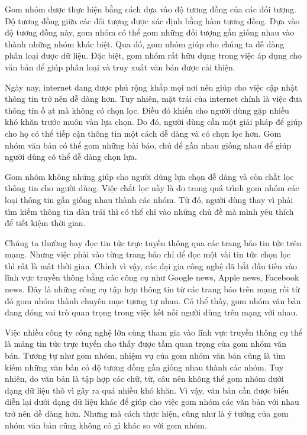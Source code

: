Gom nhóm được thực hiện bằng cách dựa vào độ tương đồng của các đối tượng.
Độ tương đồng giữa các đối tượng được xác định bằng hàm tương đồng.
Dựa vào độ tương đồng này, gom nhóm có thể gom những đối tượng gần giống nhau vào thành những nhóm khác biệt.
Qua đó, gom nhóm giúp cho chúng ta dễ dàng phân loại được dữ liệu.
Đặc biệt, gom nhóm rất hữu dụng trong việc áp dụng cho văn bản để giúp phân loại và truy xuất văn bản được cải thiện.

Ngày nay, internet đang được phủ rộng khắp mọi nơi nên giúp cho việc cập nhật thông tin trở nên dễ dàng hơn.
Tuy nhiên, mặt trái của internet chính là việc đưa thông tin ồ ạt mà không có chọn lọc.
Điều đó khiến cho người dùng gặp nhiều khó khăn trước muôn vàn lựa chọn.
Do đó, người dùng cần một giải pháp để giúp cho họ có thể tiếp cận thông tin một cách dễ dàng và có chọn lọc hơn.
Gom nhóm văn bản có thể gom những bài báo, chủ để gần nhau giống nhau để giúp người dùng có thể dễ dàng chọn lựa.

Gom nhóm không những giúp cho người dùng lựa chọn dễ dàng và còn chắt lọc thông tin cho người dùng.
Việc chắt lọc này là do trong quá trình gom nhóm các loại thông tin gần giống nhau thành các nhóm.
Từ đó, người dùng thay vì phải tìm kiếm thông tin dàn trải thì có thể chỉ vào những chủ đề mà mình yêu thích để tiết kiệm thời gian.

Chúng ta thường hay đọc tin tức trực tuyến thông qua các trang báo tin tức trên mạng.
Nhưng việc phải vào từng trang báo chỉ để đọc một vài tin tức chọn lọc thì rất là mất thời gian.
Chính vì vậy, các đại gia công nghệ đã bắt đầu tiến vào lĩnh vực truyền thông bằng các công cụ như Google news, Apple news, Facebook news. 
Đây là những công cụ tập hợp thông tin từ các trang báo trên mạng rồi từ đó gom nhóm thành chuyên mục tương tự nhau.
Có thể thấy, gom nhóm văn bản đang đóng vai trò quan trọng trong việc kết nối người dùng trên mạng với nhau.

Việc nhiều công ty công nghệ lớn cùng tham gia vào lĩnh vực truyền thông cụ thể là mảng tin tức trực tuyến cho thấy được tầm quan trọng của gom nhóm văn bản.
Tương tự như gom nhóm, nhiệm vụ của gom nhóm văn bản cũng là tìm kiếm những văn bản có độ tương đồng gần giống nhau thành các nhóm.
Tuy nhiên, do văn bản là tập hợp các chữ, từ, câu nên không thể gom nhóm dưới dạng dữ liệu thô vì gây ra quá nhiều khó khăn.
Vì vậy, văn bản cần được biểu diễn lại dưới dạng dữ liệu khác để giúp cho việc gom nhóm các văn bản với nhau trở nên dễ dàng hơn.
Nhưng mà cách thực hiện, cũng như là ý tưởng của gom nhóm văn bản cũng không có gì khác so với gom nhóm.

